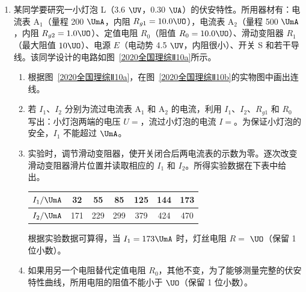 \documentclass[\gkver]{gaokaozhenti}
\begin{document}
\begin{enumerate}
{带入已知数据解得 $a'=1.96\Umsq$；

（3）在实验中绳和滑轮之间有摩擦会造成实际计算值偏小。
}

\item
某同学要研究一小灯泡 L（3.6 $\UV$，0.30 $\UA$）的伏安特性。所用器材有：电流表 A$_{1}$（量程 200 $\UmA$，内阻 $R_{g1}=10.0\UO$），电流表 A$_{2}$（量程 500 $\UmA$，内阻 $R_{g2}=1.0\UO$）、定值电阻 $R_{0}$（阻值 $R_{0}=10.0\UO$）、滑动变阻器 $R_{1}$（最大阻值 $10\UO$）、电源 $E$（电动势 4.5 $\UV$，内阻很小）、开关 S 和若干导线。该同学设计的电路如图~\ref{2020全国理综Ⅱ10a}所示。

\begin{enumerate}
\item
根据图~\ref{2020全国理综Ⅱ10a}，在图~\ref{2020全国理综Ⅱ10b}的实物图中画出连线\tkanswer[3cm]{}。


\item
若 $I_{1}$、$I_{2}$ 分别为流过电流表 A$_{1}$ 和 A$_{2}$ 的电流，利用 $I_{1}$、$I_{2}$、$R_{g1}$ 和 $R_{0}$ 写出：小灯泡两端的电压 $U=$，流过小灯泡的电流 $I=$。为保证小灯泡的安全，$I_{1}$ 不能超过 $\UmA$。

\item
实验时，调节滑动变阻器，使开关闭合后两电流表的示数为零。逐次改变滑动变阻器滑片位置并读取相应的 $I_{1}$ 和 $I_{2}$。所得实验数据在下表中给出。

\begin{center}
\begin{tabular}{|c|cccccc|}
\hline
$I_{1}/\UmA$ & 32 & 55 & 85 & 125 & 144 & 173 \\
\hline
$I_{2}/\UmA$ & 171 & 229 & 299 & 379 & 424 & 470 \\
\hline
\end{tabular}
\end{center}

根据实验数据可算得，当 $I_{1}=173\UmA$ 时，灯丝电阻 $R=$ $\UO$（保留 1 位小数）。

\item
如果用另一个电阻替代定值电阻 $R_{0}$，其他不变，为了能够测量完整的伏安特性曲线，所用电阻的阻值不能小于 $\UO$（保留 1 位小数）。
\end{enumerate}
\end{enumerate}
\end{document}
